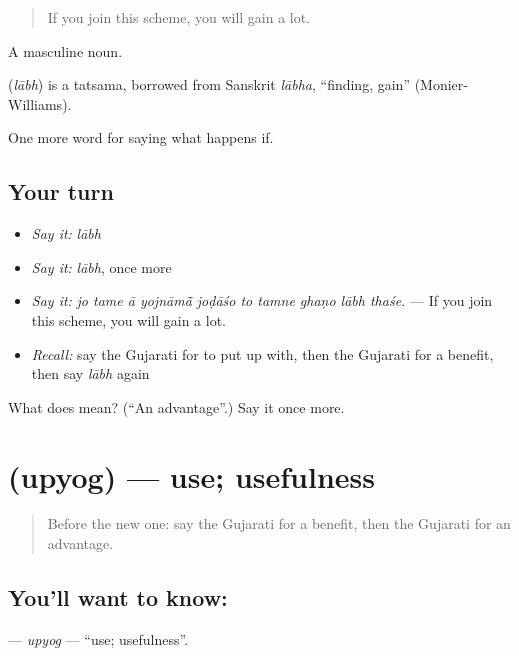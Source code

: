 \begin{quote}
If you join this scheme, you will gain a lot.
\end{quote}

A masculine noun.

\begin{cousinweb}
\textbf{} (\emph{lābh}) is a tatsama, borrowed from Sanskrit \emph{lābha}, \textquotedblleft{}finding, gain\textquotedblright{} (Monier-Williams).
\end{cousinweb}

\begin{grammarlens}[title={What you've built}]
One more word for saying what happens if.
\end{grammarlens}

\subsection*{Your turn}
\begin{itemize}
\raggedright
  \item \emph{Say it:} \emph{lābh}
  \item \emph{Say it:} \emph{lābh}, once more
  \item \emph{Say it:} \emph{jo tame ā yojnāmā̃ joḍāśo to tamne ghaṇo lābh thaśe.} — If you join this scheme, you will gain a lot.
  \item \emph{Recall:} say the Gujarati for to put up with, then the Gujarati for a benefit, then say \emph{lābh} again
\end{itemize}

\begin{tcolorbox}[breakable,colback=teal!4,colframe=teal!35!black,title={Before you move on}]
What does  mean? (\textquotedblleft{}An advantage\textquotedblright{}.) Say it once more.
\end{tcolorbox}
\section[\texorpdfstring{\gu{ઉપયોગ} (upyog)}{ઉપયોગ (upyog)}]{ (upyog) — use; usefulness}

\label{lesson:GU-C371-upyog}



\begin{quote}
Before the new one: say the Gujarati for a benefit, then the Gujarati for an advantage.
\end{quote}

\subsection*{You'll want to know: }
\textbf{} — \emph{upyog} — \textquotedblleft{}use; usefulness\textquotedblright{}.

